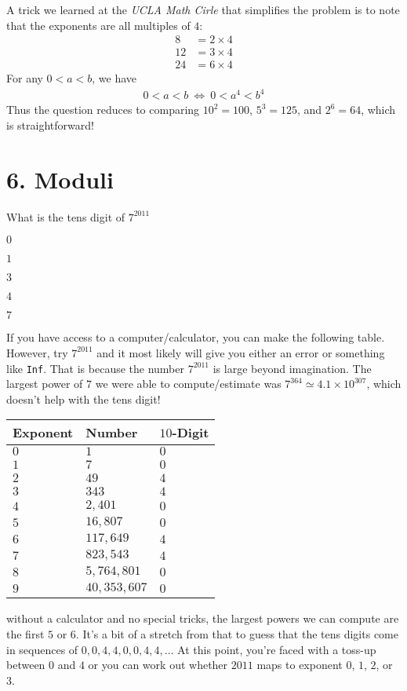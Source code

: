 \documentclass[12pt]{article}
\begin{document}
A trick we learned at the \textit{UCLA Math Cirle} that simplifies the problem is to note that the exponents are all multiples of $4$:
\begin{align*}
 8 & = 2 \times 4 \\
12 & = 3 \times 4 \\
24 & = 6 \times 4
\end{align*}
For any $0<a<b$, we have
\begin{align*}
0 < a < b
~\Longleftrightarrow~
0 < a^4 < b^4
\end{align*}
Thus the question reduces to comparing $10^{2}=100$, $5^{3}=125$, and $2^{6}=64$, which is straightforward!



\newpage
\section*{6. Moduli}
\begin{question}
What is the tens digit of $7^{2011}$ 
\begin{enumerate*}
  \item $0$
  \item $1$
  \item $3$
  \item $4$
  \item $7$
\end{enumerate*}
\end{question}

If you have access to a computer/calculator, you can make the following table. However, try $7^{2011}$ and it most likely will give you either an error or something like \texttt{Inf}. That is because the number $7^{2011}$ is large beyond imagination. The largest power of $7$ we were able to compute/estimate was $7^{364} \simeq 4.1 \times 10^{307}$, which doesn't help with the tens digit!
\begin{center}
\begin{tabular}{lll}
    \hline
    Exponent  &  Number &  $10$-Digit \\
    \hline
    $0$  &  $1$ &  $0$ \\
    $1$  &  $7$ &  $0$ \\
    $2$  &  $49$ &  $4$ \\
    $3$  &  $343$ &  $4$ \\
    $4$  &  $2,401$ &  $0$ \\
    $5$  &  $16,807$ &  $0$ \\
    $6$  &  $117,649$ &  $4$ \\
    $7$  &  $823,543$ &  $4$ \\
    $8$  &  $5,764,801$ &  $0$ \\
    $9$  &  $40,353,607$ &  $0$ \\
    \hline
    \end{tabular}
\end{center}
without a calculator and no special tricks, the largest powers we can compute are the first $5$ or $6$. It's a bit of a stretch from that to guess that the tens digits come in sequences of $0,0,4,4,0,0,4,4,\ldots$ At this point, you're faced with a toss-up between $0$ and $4$ or you can work out whether $2011$ maps to exponent $0$, $1$, $2$, or $3$.
\end{document}
